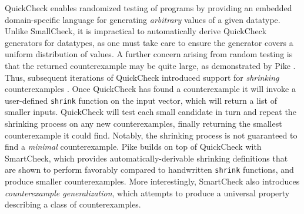 QuickCheck \cite{claessen_quickcheck:_2000,claessen_testing_2002}
enables randomized testing of \haskell programs by providing an embedded
domain-specific language for generating \emph{arbitrary} values of a
given datatype.
%
%
Unlike SmallCheck, it is impractical to automatically derive QuickCheck
generators for datatypes, as one must take care to ensure the generator
covers a uniform distribution of values.
%
%
A further concern arising from random testing is that the returned
counterexample may be quite large, as demonstrated by Pike
\cite{pike_smartcheck:_2014}.
%
Thus, subsequent iterations of QuickCheck introduced support for
\emph{shrinking} counterexamples \cite{hughes_quickcheck_2006}.
%
Once QuickCheck has found a counterexample it will invoke a user-defined
\texttt{shrink} function on the input vector, which will return a list
of smaller inputs.
%
QuickCheck will test each small candidate in turn and repeat the
shrinking process on any new counterexamples, finally returning the
smallest counterexample it could find.
%
Notably, the shrinking process is not guaranteed to find a
\emph{minimal} counterexample.
%
Pike \cite{pike_smartcheck:_2014} builds on top of QuickCheck with
SmartCheck, which provides automatically-derivable shrinking definitions
that are shown to perform favorably compared to handwritten
\texttt{shrink} functions, and produce smaller counterexamples.
%
More interestingly, SmartCheck also introduces \emph{counterexample
  generalization}, which attempts to produce a universal property
describing a class of counterexamples.
%
